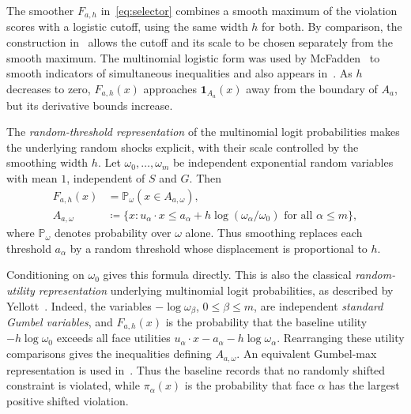 \documentclass[11pt,letterpaper,twoside,leqno]{article}
\theoremstyle{bookplain}
\theoremstyle{bookremark}
\newcommand{\Pp}{\mathbb P}
\newcommand{\ind}{\mathbf 1}
\begin{document}
{
The smoother \(F_{a,h}\) in~\eqref{eq:selector} combines a smooth
maximum of the violation scores with a logistic cutoff, using the
same width \(h\) for both. By comparison,
the construction in~\cite{CCK2013} allows the cutoff and its scale to
be chosen separately from the smooth maximum. The multinomial
logistic form was used by McFadden~\cite[p.~1001]{McFadden1989} to
smooth indicators of simultaneous inequalities and also appears
in~\cite[eq.~(5)]{GaoZhang}. As \(h\) decreases to zero,
\(F_{a,h}(x)\) approaches \(\ind_{A_a}(x)\) away from the boundary
of \(A_a\), but its derivative bounds increase.
}

{The \emph{random-threshold representation} of the multinomial logit
probabilities makes the underlying random shocks explicit, with their
scale controlled by the smoothing width \(h\).} Let \(\omega_0,\ldots,\omega_m\) be independent
exponential random variables with mean \(1\), independent of \(S\) and
\(G\). Then
\begin{equation}
 \begin{split}
 F_{a,h}(x)&=\Pp_\omega(x\in A_{a,\omega}),\\
 A_{a,\omega}&\coloneqq\{x:u_\alpha\cdot x\le
 a_\alpha+h\log(\omega_\alpha/\omega_0)
                   \text{ for all }\alpha\le m\},
 \end{split}
 \label{eq:mixture}
\end{equation}
where $\Pp_\omega$ denotes probability over $\omega$ alone. {Thus smoothing replaces each threshold \(a_\alpha\) by a random threshold whose displacement is proportional to \(h\).} 

Conditioning on \(\omega_0\) gives this formula directly. This is also
the classical \emph{random-utility representation} underlying
multinomial logit probabilities, as described by
Yellott~\cite[Section~2.6]{Yellott1977}. Indeed, the variables
\(-\log\omega_\beta\), \(0\le\beta\le m\), are independent
\emph{standard Gumbel variables}, and \(F_{a,h}(x)\) is the probability
that the baseline utility \(-h\log\omega_0\) exceeds all face utilities
\(u_\alpha\cdot x-a_\alpha-h\log\omega_\alpha\).
Rearranging these utility comparisons gives the inequalities defining
\(A_{a,\omega}\). {An equivalent Gumbel-max
representation is used in~\cite[Lemma~14]{GaoZhang}.}
{
Thus the baseline records that no randomly shifted constraint is
violated, while \(\pi_\alpha(x)\) is the probability that face
\(\alpha\) has the largest positive shifted violation.
}
\end{document}
